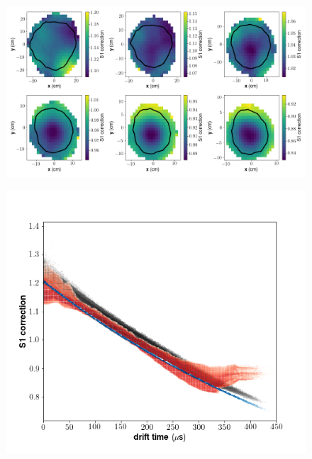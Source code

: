 \begin{figure}[h!]
\centering
\includegraphics[width=150mm]{Figures/S1corr_xy.png}
\caption{}
\label{fig:S1corr_xy} 
\end{figure}

\begin{figure}[h!]
\centering
\includegraphics[width=150mm]{Figures/S1corr_dt.png}
\caption{}
\label{fig:S1corr_dt} 
\end{figure}


